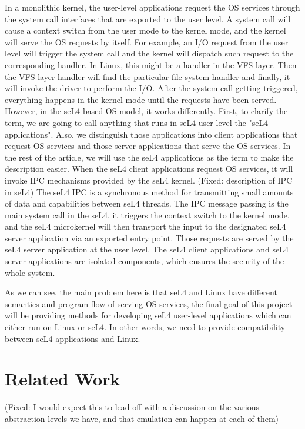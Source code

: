 In a monolithic kernel, the user-level applications request the OS services through the system call interfaces that are exported to the user level. A system call will cause a context switch from the user mode to the kernel mode, and the kernel will serve the OS requests by itself. For example, an I/O request from the user level will trigger the system call and the kernel will dispatch such request to the corresponding handler. In Linux, this might be a handler in the VFS layer. Then the VFS layer handler will find the particular file system handler and finally, it will invoke the driver to perform the I/O. After the system call getting triggered, everything happens in the kernel mode until the requests have been served. However, in the seL4 based OS model, it works differently. First, to clarify the term, we are going to call anything that runs in seL4 user level the "seL4 applications". Also, we distinguish those applications into client applications that request OS  services and those server applications that serve the OS services. In the rest of the article, we will use the seL4 applications as the term to make the description easier. When the seL4 client applications request OS services, it will invoke IPC mechanisms provided by the seL4 kernel. (Fixed: description of IPC in seL4) The seL4 IPC is a synchronous method for transmitting small amounts of data and capabilities between seL4 threads. The IPC message passing is the main system call in the seL4, it triggers the context switch to the kernel mode, and the seL4 microkernel will then transport the input to the designated seL4 server application via an exported entry point. Those requests are served by the seL4 server application at the user level. The seL4 client applications and seL4 server applications are isolated components, which ensures the security of the whole system.

As we can see, the main problem here is that seL4 and Linux have different semantics and program flow of serving OS services, the final goal of this project will be providing methods for developing seL4 user-level applications which can either run on Linux or seL4. In other words, we need to provide compatibility between seL4 applications and Linux.

\section{Related Work}

(Fixed: I would expect this to lead off with a discussion on the various abstraction levels we have, and that emulation can happen at each of them)

